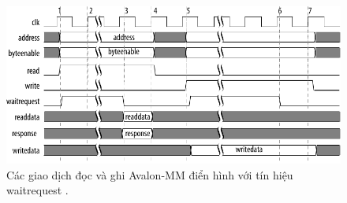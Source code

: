 \begin{figure}[htbp]
    \centering
    \includegraphics[width=\linewidth]{Images/02_01_Avalon_MM_Transfers.pdf}
    \caption{Các giao dịch đọc và ghi Avalon-MM điển hình với tín hiệu waitrequest \cite{avalon_mm_transfer}.}
    \label{fig:02_01_avalon_mm_transfer}
\end{figure}

